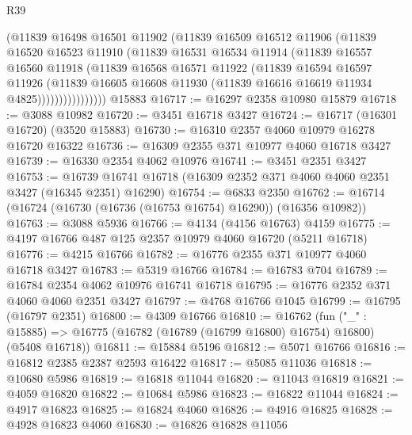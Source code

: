 \begin{lexlean}{R39}
\begin{coremodule}
                  (@11839
                    @16498
                    @16501
                    @11902
                    (@11839
                      @16509
                      @16512
                      @11906
                      (@11839
                        @16520
                        @16523
                        @11910
                        (@11839
                          @16531
                          @16534
                          @11914
                          (@11839
                            @16557
                            @16560
                            @11918
                            (@11839
                              @16568
                              @16571
                              @11922
                              (@11839
                                @16594
                                @16597
                                @11926
                                (@11839
                                  @16605
                                  @16608
                                  @11930
                                  (@11839 @16616 @16619 @11934 @4825))))))))))))))))
    @15883
@16717 := @16297 @2358 @10980 @15879
@16718 := @3088 @10982
@16720 := @3451 @16718 @3427
@16724 := @16717 (@16301 @16720) (@3520 @15883)
@16730 := @16310 @2357 @4060 @10979 @16278 @16720 @16322
@16736 := @16309 @2355 @371 @10977 @4060 @16718 @3427
@16739 := @16330 @2354 @4062 @10976
@16741 := @3451 @2351 @3427
@16753 := @16739 @16741 @16718 (@16309 @2352 @371 @4060 @4060 @2351 @3427 (@16345 @2351) @16290)
@16754 := @6833 @2350
@16762 := @16714 (@16724 (@16730 (@16736 (@16753 @16754) @16290)) (@16356 @10982))
@16763 := @3088 @5936
@16766 := @4134 (@4156 @16763) @4159
@16775 := @4197 @16766 @487 @125 @2357 @10979 @4060 @16720 (@5211 @16718)
@16776 := @4215 @16766
@16782 := @16776 @2355 @371 @10977 @4060 @16718 @3427
@16783 := @5319 @16766
@16784 := @16783 @704
@16789 := @16784 @2354 @4062 @10976 @16741 @16718
@16795 := @16776 @2352 @371 @4060 @4060 @2351 @3427
@16797 := @4768 @16766 @1045
@16799 := @16795 (@16797 @2351)
@16800 := @4309 @16766
@16810 := @16762
    (fun ("_" : @15885) => @16775 (@16782 (@16789 (@16799 @16800) @16754) @16800) (@5408 @16718))
@16811 := @15884 @5196
@16812 := @5071 @16766
@16816 := @16812 @2385 @2387 @2593 @16422
@16817 := @5085 @11036
@16818 := @10680 @5986
@16819 := @16818 @11044
@16820 := @11043 @16819
@16821 := @4059 @16820
@16822 := @10684 @5986
@16823 := @16822 @11044
@16824 := @4917 @16823
@16825 := @16824 @4060
@16826 := @4916 @16825
@16828 := @4928 @16823 @4060
@16830 := @16826 @16828 @11056

\end{coremodule}
\end{lexlean}
